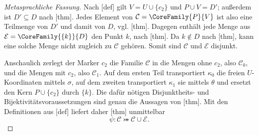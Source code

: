 \documentclass[main.tex]{subfiles}
\begin{document}
\pagebreak[2]
\begin{proof}[Metasprachliche Fassung]
Nach [def] gilt
\(V=U\cup\{c_2\}\) und \(P\cup V=D'\); außerdem ist
\(D'\subseteq D\) nach
[thm]. Jedes Element von
\(\mathcal C=\CoreFamily{P}{V}\) ist also eine Teilmenge von \(D'\) und
damit von \(D\), vgl.
[thm]. Dagegen enthält jede
Menge aus \(\mathcal E=\CoreFamily{\{k\}}{D}\) den Punkt \(k\), nach
[thm]. Da \(k\notin D\) nach
[thm], kann
eine solche Menge nicht zugleich zu \(\mathcal C\) gehören. Somit sind
\(\mathcal C\) und \(\mathcal E\) disjunkt.

Anschaulich zerlegt der Marker \(c_2\) die Familie \(\mathcal C\) in
die Mengen ohne \(c_2\), also \(\mathcal C_0\), und die Mengen mit
\(c_2\), also \(\mathcal C_1\). Auf dem ersten Teil transportiert
\(\kappa_0\) die freien \(U\)-Koordinaten mittels \(\sigma\), auf dem
zweiten transportiert \(\kappa_1\) sie mittels \(\theta\) und ersetzt
den Kern \(P\cup\{c_2\}\) durch \(\{k\}\). Die dafür nötigen
Disjunktheits- und Bijektivitätsvoraussetzungen sind genau die Aussagen
von [thm].
Mit den Definitionen aus
[def] liefert daher
[thm] unmittelbar
\[
  \psi\colon\mathcal C\bij\mathcal C\cup\mathcal E.
\]
\end{proof}
\end{document}
